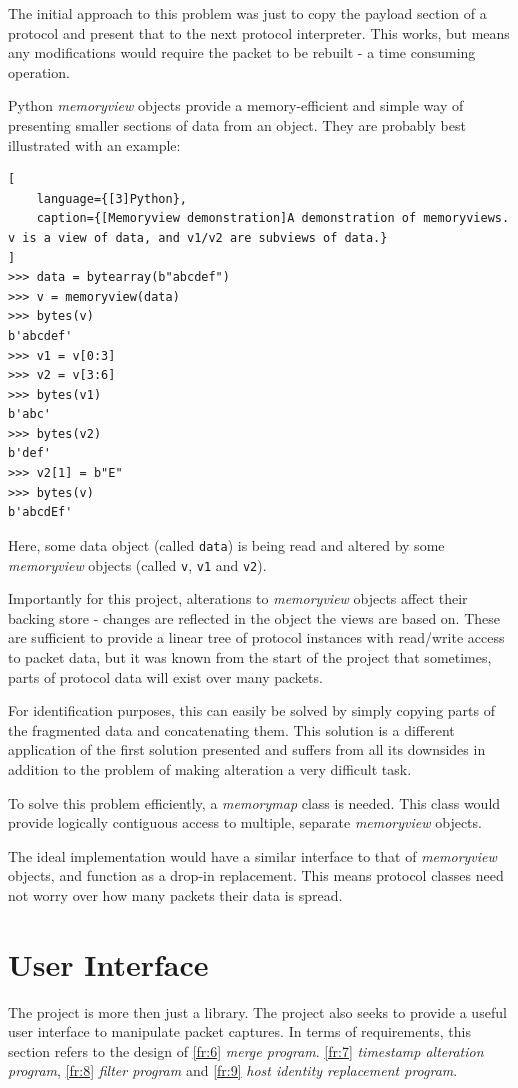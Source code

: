 \documentclass[10pt,a4paper,notitlepage,twoside]{report}
\begin{document}
The initial approach to this problem was just to copy the payload section of a protocol and present that to the next protocol interpreter. This works, but means any modifications would require the packet to be rebuilt - a time consuming operation.

Python \emph{memoryview} objects provide a memory-efficient and simple way of presenting smaller sections of data from an object. They are probably best illustrated with an example:
\begin{lstlisting}[
	language={[3]Python},
   	caption={[Memoryview demonstration]A demonstration of memoryviews. v is a view of data, and v1/v2 are subviews of data.}
]
>>> data = bytearray(b"abcdef")
>>> v = memoryview(data)
>>> bytes(v)
b'abcdef'
>>> v1 = v[0:3]
>>> v2 = v[3:6]
>>> bytes(v1)
b'abc'
>>> bytes(v2)
b'def'
>>> v2[1] = b"E"
>>> bytes(v)
b'abcdEf'
\end{lstlisting}
Here, some data object (called \texttt{data}) is being read and altered by some \emph{memoryview} objects (called \texttt{v}, \texttt{v1} and \texttt{v2}).

Importantly for this project, alterations to \emph{memoryview} objects affect their backing store - changes are reflected in the object the views are based on. These are sufficient to provide a linear tree of protocol instances with read/write access to packet data, but it was known from the start of the project that sometimes, parts of protocol data will exist over many packets.

For identification purposes, this can easily be solved by simply copying parts of the fragmented data and concatenating them. This solution is a different application of the first solution presented and suffers from all its downsides in addition to the problem of making alteration a very difficult task.

To solve this problem efficiently, a \emph{memorymap} class is needed. This class would provide logically contiguous access to multiple, separate \emph{memoryview} objects.

The ideal implementation would have a similar interface to that of \emph{memoryview} objects, and function as a drop-in replacement. This means protocol classes need not worry over how many packets their data is spread.

\section{User Interface}
The project is more then just a library. The project also seeks to provide a useful user interface to manipulate packet captures. In terms of requirements, this section refers to the design of \ref{fr:6} \emph{merge program}. \ref{fr:7} \emph{timestamp alteration program}, \ref{fr:8} \emph{filter program} and \ref{fr:9} \emph{host identity replacement program}.
\end{document}

